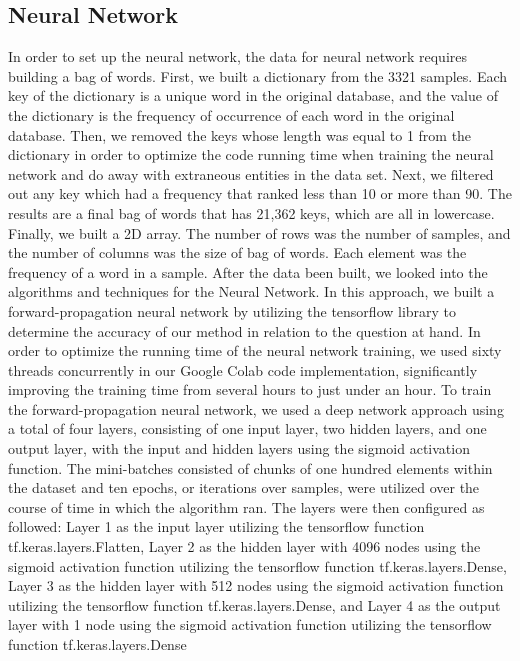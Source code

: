 \documentclass{article}
\begin{document}
    \subsection{Neural Network}
    In order to set up the neural network, the data for neural network requires building a bag of words. First, we built a dictionary from the 3321 samples. Each key of the dictionary is a unique word in the original database, and the value of the dictionary is the frequency of occurrence of each word in the original database. Then, we removed the keys whose length was equal to 1 from the dictionary in order to optimize the code running time when training the neural network and do away with extraneous entities in the data set. Next, we filtered out any key which had a frequency that ranked less than 10 or more than 90.  The results are a final bag of words that has 21,362 keys, which are all in lowercase.  Finally, we built a  2D array. The number of rows was the number of samples, and the number of columns was the size of bag of words. Each element was the frequency of a word in a sample.  After the data been built, we looked into the algorithms and techniques for the Neural Network.  In this approach, we built a forward-propagation neural network by utilizing the tensorflow library to determine the accuracy of our method in relation to the question at hand. In order to optimize the running time of the neural network training, we used sixty threads concurrently in our Google Colab code implementation, significantly improving the training time from several hours to just under an hour. To train the forward-propagation neural network, we used a deep network approach using a total of four layers, consisting of one input layer, two hidden layers, and one output layer, with the input and hidden layers using the sigmoid activation function. The mini-batches consisted of chunks of one hundred elements within the dataset and ten epochs, or iterations over samples, were utilized over the course of time in which the algorithm ran. The layers were then configured as followed: Layer 1 as the input layer utilizing the tensorflow function tf.keras.layers.Flatten, Layer 2 as the hidden layer with 4096 nodes using the sigmoid activation function utilizing the tensorflow function tf.keras.layers.Dense, Layer 3 as the hidden layer with 512 nodes using the sigmoid activation function utilizing the tensorflow function tf.keras.layers.Dense, and Layer 4 as the output layer with 1 node using the sigmoid activation function utilizing the tensorflow function tf.keras.layers.Dense
    
\end{document}
